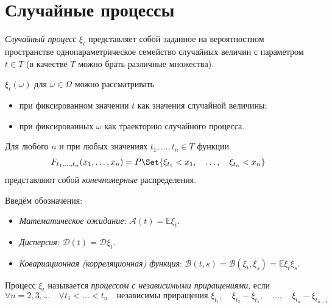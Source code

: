 \chapter{Случайные процессы}

\begin{definition}
    \emph{Случайный процесс} $ \xi_t $ представляет собой заданное на вероятностном пространстве
    однопараметрическое семейство случайных величин с параметром $ t \in T $ (в качестве $ T $ можно
    брать различные множества).
\end{definition}

$ \xi_t(\omega) $ для $ \omega \in \Omega $ можно рассматривать
\begin{itemize}
    \item при фиксированном значении $ t $ как значения случайной величины;
    \item при фиксированных $ \omega $ как траекторию случайного процесса.
\end{itemize}

\begin{definition}
    Для любого $ n $ и при любых значениях $ t_1, \dots, t_n \in T $ функции
    $$ F_{t_1, \dots, t_n}(x_1, \dots, x_n) = P\Set{\xi_{t_1} < x_1, \quad \dots, \quad
    \xi_{t_n} < x_n} $$
    представляют собой \emph{конечномерные} распределения.
\end{definition}

\begin{notation}
    Введём обозначения:
    \begin{itemize}
        \item \emph{Математическое ожидание}: $ \mathcal A(t) = \mathbb E \xi_t $.
        \item \emph{Дисперсия}: $ \mathcal D(t) = \mathcal D \xi_t $.
        \item \emph{Ковариационная (корреляционная) функция}: $ \mathcal B(t, s) =
            \mathcal B(\xi_t, \xi_s) = \mathbb E \xi_t \xi_s $.
    \end{itemize}
\end{notation}

\begin{definition}
    Процесс $ \xi_t $ называется \emph{процессом с независимыми приращениями}, если
    $$ \forall n = 2, 3, \dotsc \quad \forall t_1 < \dots < t_n \quad
    \text{независимы приращения } \xi_{t_1}, \quad \xi_{t_2} - \xi_{t_1}, \quad \dots, \quad
    \xi_{t_n} - \xi_{t_{n - 1}} $$
\end{definition}

